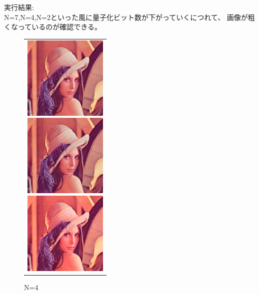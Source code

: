 \documentclass[a4paper,titlepage,11pt]{ltjsarticle}
\begin{document}
実行結果:\\
N=7,N=4,N=2といった風に量子化ビット数が下がっていくにつれて、
画像が粗くなっているのが確認できる。
\begin{figure}[H]
\begin{center}
\begin{tabular}{c}
\begin{minipage}{0.25\hsize}
\begin{center}
\includegraphics[width=4cm]{lena256.jpg}
\end{center}
\caption*{元画像}
\end{minipage}
\begin{minipage}{0.25\hsize}
\begin{center}
\includegraphics[width=4cm]{quantize_7bit.jpg}
\end{center}
\caption*{N=7}
\end{minipage}
\begin{minipage}{0.25\hsize}
\begin{center}
\includegraphics[width=4cm]{quantize_4bit.jpg}
\end{center}
\caption*{N=4}
\end{minipage}
\begin{minipage}{0.25\hsize}
\begin{center}

\end{center}
\end{minipage}
\end{tabular}
\end{center}
\end{figure}
\end{document}
